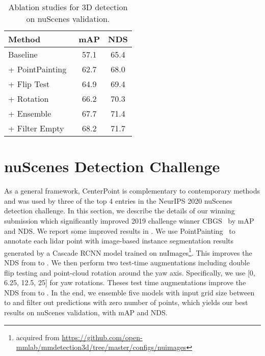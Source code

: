 \documentclass[final]{cvpr}
\begin{document}
\begin{table}[t]
\vspace{-2mm}
\begin{center}
\begin{tabular}{lcc}
  \toprule
   Method & mAP & NDS \\
  \midrule
  Baseline & 57.1 & 65.4  \\ 
  + PointPainting~\cite{vora2019pointpainting} & 62.7 & 68.0 \\ 
  + Flip Test & 64.9 & 69.4 \\ 
  + Rotation & 66.2 & 70.3 \\ 
  + Ensemble & 67.7& 71.4 \\ 
  + Filter Empty & 68.2 & 71.7 \\
  \bottomrule

\end{tabular}
\end{center}
\vspace{-5mm}
\caption{Ablation studies for 3D detection on nuScenes validation. 
}
\end{table}



\section{nuScenes Detection Challenge}
As a general framework, CenterPoint is complementary to contemporary methods and was used by three of the top 4 entries in the NeurIPS 2020 nuScenes detection challenge.  
In this section, we describe the details of our winning submission which significantly improved 2019 challenge winner CBGS~\cite{zhu2019classbalanced} by  mAP and  NDS. 
We report some improved results in . 
We use PointPainting~\cite{vora2019pointpainting} to annotate each lidar point with image-based instance segmentation results generated by a Cascade RCNN model trained on nuImages\footnote{acquired from \url{https://github.com/open-mmlab/mmdetection3d/tree/master/configs/nuimages}}. 
This improves the NDS from  to . 
We then perform two test-time augmentations including double flip testing and point-cloud rotation around the yaw axis. 
Specifically, we use [0\textdegree,  6.25\textdegree,  12.5\textdegree,  25\textdegree] for yaw rotations.
Theses test time augmentations improve the NDS from  to .
In the end, we ensemble five models with input grid size between  to  and filter out predictions with zero number of points, which yields our best results on nuScenes validation, with  mAP and  NDS. 
\end{document}
